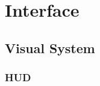 \documentclass[12pt,titlepage]{article}
\begin{document}









\newpage
\section{Interface}

\subsection{Visual System}

\subsubsection{HUD}
\end{document}
